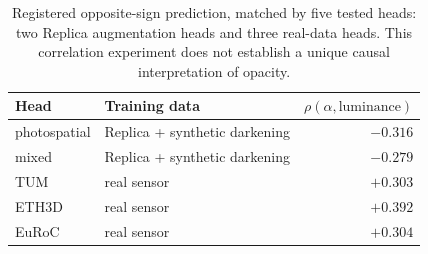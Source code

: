 \begin{table}[t]
\centering\small
\begin{tabular}{@{}llr@{}}
\toprule
Head & Training data & $\rho(\alpha,\text{luminance})$ \\
\midrule
photospatial & Replica + synthetic darkening & $-0.316$ \\
mixed        & Replica + synthetic darkening & $-0.279$ \\
TUM          & real sensor                   & $+0.303$ \\
ETH3D        & real sensor                   & $+0.392$ \\
EuRoC        & real sensor                   & $+0.304$ \\
\bottomrule
\end{tabular}
\caption[Opacity--luminance correlations on five heads]{Registered
opposite-sign prediction, matched by five tested heads: two Replica
augmentation heads and three real-data heads. This correlation experiment
does not establish a unique causal interpretation of opacity.}
\label{tab:lum}
\end{table}
